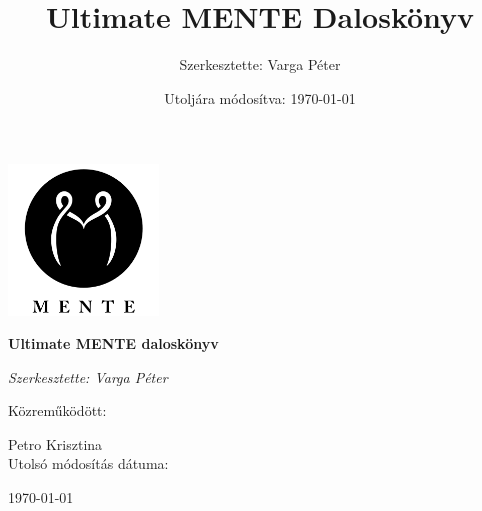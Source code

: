 \documentclass[a4paper,12pt,twoside,openany]{book}
\begin{document}
\frontmatter
\author{Szerkesztette: Varga Péter}
\title{Ultimate MENTE Daloskönyv}
\date{Utoljára módosítva: \today}
\titleformat{\chapter}[display]
	{\normalfont\bfseries}{}{0pt}{\Huge}

\begin{titlepage}
	\centering
	\includegraphics[width=0.3\textwidth]{images/mente_logo.png}\par\vspace{1cm}
	{\huge\bfseries Ultimate MENTE daloskönyv\par}
	\vspace{2cm}
	{\Large\itshape Szerkesztette: Varga Péter\par}
	\vfill
	Közreműködött:\par
	Petro Krisztina\\
	\vfill
	Utolsó módosítás dátuma:
	{\large \today\par}
\end{titlepage}

\setcounter{tocdepth}{2}
\tableofcontents

\mainmatter








\backmatter
\end{document}
